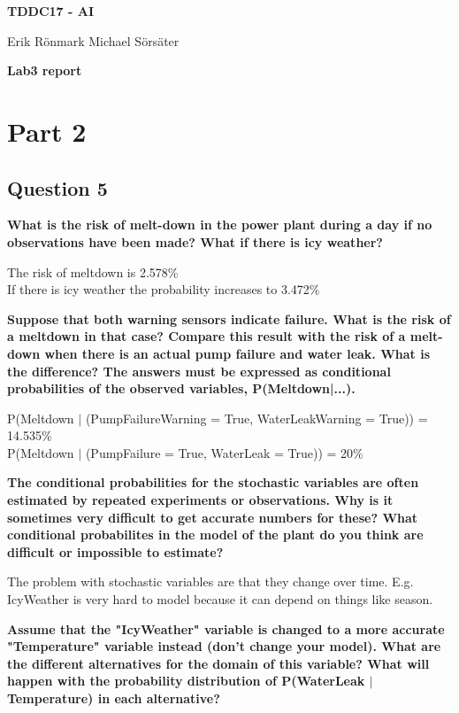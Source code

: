 \documentclass[12pt,a4paper]{article}
\begin{document}
\begin{center}
    \Huge
    \textbf{TDDC17 - AI}

    \vspace{0.3cm}
    \Large
    Erik Rönmark
    Michael Sörsäter
    
    \vspace{0.7cm}
    \textbf{Lab3 report}
\end{center}

\section{Part 2}
\subsection{Question 5}
\textbf{What is the risk of melt-down in the power plant during a day if no observations have been made? What if there is icy weather?}

The risk of meltdown is 2.578\% \\
If there is icy weather the probability increases to 3.472\%

\textbf{Suppose that both warning sensors indicate failure. What is the risk of a meltdown in that case? Compare this result with the risk of a melt-down when there is an actual pump failure and water leak. What is the difference? The answers must be expressed as conditional probabilities of the observed variables, P(Meltdown|...).}

P(Meltdown $|$ (PumpFailureWarning = True, WaterLeakWarning = True)) = 14.535\% \\
P(Meltdown $|$ (PumpFailure = True, WaterLeak = True)) = 20\%

\textbf{The conditional probabilities for the stochastic variables are often estimated by repeated experiments or observations. Why is it sometimes very difficult to get accurate numbers for these? What conditional probabilites in the model of the plant do you think are difficult or impossible to estimate?}

The problem with stochastic variables are that they change over time. E.g. IcyWeather is very hard to model because it can depend on things like season. 

\textbf{Assume that the "IcyWeather" variable is changed to a more accurate "Temperature" variable instead (don't change your model). What are the different alternatives for the domain of this variable? What will happen with the probability distribution of P(WaterLeak $|$ Temperature) in each alternative?}
\end{document}
